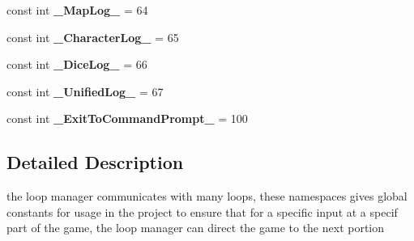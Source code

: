 \begin{DoxyCompactItemize}
const int {\bfseries \+\_\+\+Map\+Log\+\_\+} = 64
\item 
\hypertarget{namespace_destination_from_menus_ae62a7a744a2a8da3329f0a84dc76aaa1}{}\label{namespace_destination_from_menus_ae62a7a744a2a8da3329f0a84dc76aaa1} 
const int {\bfseries \+\_\+\+Character\+Log\+\_\+} = 65
\item 
\hypertarget{namespace_destination_from_menus_a2170d390d2785bedc3d233f949919b6d}{}\label{namespace_destination_from_menus_a2170d390d2785bedc3d233f949919b6d} 
const int {\bfseries \+\_\+\+Dice\+Log\+\_\+} = 66
\item 
\hypertarget{namespace_destination_from_menus_a5f8c455afab681708ccea3434951c58c}{}\label{namespace_destination_from_menus_a5f8c455afab681708ccea3434951c58c} 
const int {\bfseries \+\_\+\+Unified\+Log\+\_\+} = 67
\item 
\hypertarget{namespace_destination_from_menus_a98e9db67799478d29a6520aaa62fcf1e}{}\label{namespace_destination_from_menus_a98e9db67799478d29a6520aaa62fcf1e} 
const int {\bfseries \+\_\+\+Exit\+To\+Command\+Prompt\+\_\+} = 100
\end{DoxyCompactItemize}


\subsection{Detailed Description}
the loop manager communicates with many loops, these namespaces gives global constants for usage in the project to ensure that for a specific input at a specif part of the game, the loop manager can direct the game to the next portion 